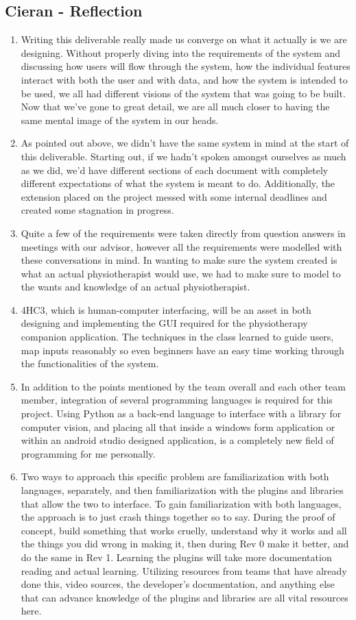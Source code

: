 \documentclass[12pt]{article}
\begin{document}
\subsection*{Cieran - Reflection}
\begin{enumerate}
  \item Writing this deliverable really made us converge on what it actually is we are designing. Without properly diving into the requirements of the system and discussing how users will flow through the system, how the individual features interact with both the user and with data, and how the system is intended to be used, we all had different visions of the system that was going to be built. Now that we’ve gone to great detail, we are all much closer to having the same mental image of the system in our heads.
  \item As pointed out above, we didn’t have the same system in mind at the start of this deliverable. Starting out, if we hadn’t spoken amongst ourselves as much as we did, we’d have different sections of each document with completely different expectations of what the system is meant to do. Additionally, the extension placed on the project messed with some internal deadlines and created some stagnation in progress.
  \item Quite a few of the requirements were taken directly from question answers in meetings with our advisor, however all the requirements were modelled with these conversations in mind. In wanting to make sure the system created is what an actual physiotherapist would use, we had to make sure to model to the wants and knowledge of an actual physiotherapist.
  \item 4HC3, which is human-computer interfacing, will be an asset in both designing and implementing the GUI required for the physiotherapy companion application. The techniques in the class learned to guide users, map inputs reasonably so even beginners have an easy time working through the functionalities of the system.
  \item In addition to the points mentioned by the team overall and each other team member, integration of several programming languages is required for this project. Using Python as a back-end language to interface with a library for computer vision, and placing all that inside a windows form application or within an android studio designed application, is a completely new field of programming for me personally.
  \item Two ways to approach this specific problem are familiarization with both languages, separately, and then familiarization with the plugins and libraries that allow the two to interface. To gain familiarization with both languages, the approach is to just crash things together so to say. During the proof of concept, build something that works cruelly, understand why it works and all the things you did wrong in making it, then during Rev 0 make it better, and do the same in Rev 1. Learning the plugins will take more documentation reading and actual learning. Utilizing resources from teams that have already done this, video sources, the developer’s documentation, and anything else that can advance knowledge of the plugins and libraries are all vital resources here.
\end{enumerate}
\end{document}
